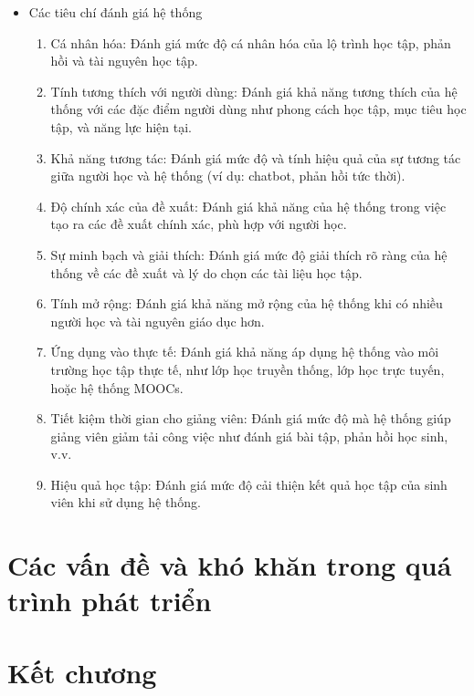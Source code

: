 \begin{itemize}
    \item Các tiêu chí đánh giá hệ thống
    \begin{enumerate}
        \item Cá nhân hóa: Đánh giá mức độ cá nhân hóa của lộ trình học tập, phản hồi và tài nguyên học tập.
        \item Tính tương thích với người dùng: Đánh giá khả năng tương thích của hệ thống với các đặc điểm người dùng như phong cách học tập, mục tiêu học tập, và năng lực hiện tại.
        \item Khả năng tương tác: Đánh giá mức độ và tính hiệu quả của sự tương tác giữa người học và hệ thống (ví dụ: chatbot, phản hồi tức thời).
        \item Độ chính xác của đề xuất: Đánh giá khả năng của hệ thống trong việc tạo ra các đề xuất chính xác, phù hợp với người học.
        \item Sự minh bạch và giải thích: Đánh giá mức độ giải thích rõ ràng của hệ thống về các đề xuất và lý do chọn các tài liệu học tập.
        \item Tính mở rộng: Đánh giá khả năng mở rộng của hệ thống khi có nhiều người học và tài nguyên giáo dục hơn.
        \item Ứng dụng vào thực tế: Đánh giá khả năng áp dụng hệ thống vào môi trường học tập thực tế, như lớp học truyền thống, lớp học trực tuyến, hoặc hệ thống MOOCs.
        \item Tiết kiệm thời gian cho giảng viên: Đánh giá mức độ mà hệ thống giúp giảng viên giảm tải công việc như đánh giá bài tập, phản hồi học sinh, v.v.
        \item Hiệu quả học tập: Đánh giá mức độ cải thiện kết quả học tập của sinh viên khi sử dụng hệ thống.
    \end{enumerate}
\end{itemize}
\section{Các vấn đề và khó khăn trong quá trình phát triển}

\section{Kết chương}

